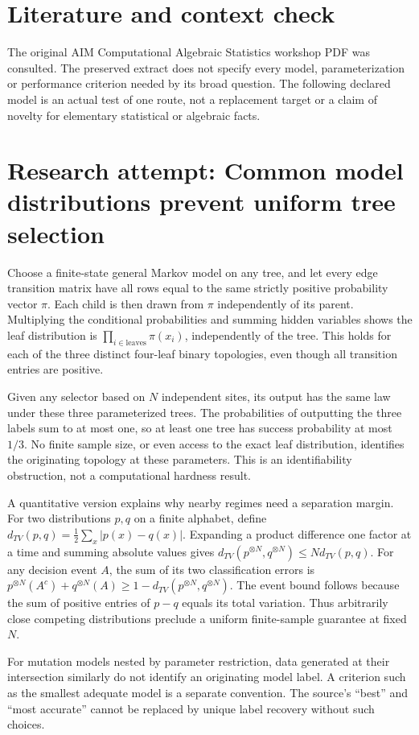\documentclass[11pt]{article}
\begin{document}
\section{Literature and context check}
The original AIM Computational Algebraic Statistics
 workshop PDF was consulted. The preserved extract does not specify every model,
 parameterization or performance criterion needed by its broad question. The
 following declared model is an actual test of one route, not a replacement
 target or a claim of novelty for elementary statistical or algebraic facts.
\section{Research attempt: Common model distributions prevent uniform tree selection}
Choose a finite-state general Markov model on any tree, and let every edge
transition matrix have all rows equal to the same strictly positive probability
vector $\pi$. Each child is then drawn from $\pi$ independently of its parent.
Multiplying the conditional probabilities and summing hidden variables shows
the leaf distribution is $\prod_{i\in\text{leaves}}\pi(x_i)$, independently
of the tree. This holds for each of the three distinct four-leaf binary
topologies, even though all transition entries are positive.

Given any selector based on $N$ independent sites, its output has the same law
under these three parameterized trees. The probabilities of outputting the
three labels sum to at most one, so at least one tree has success probability
at most $1/3$. No finite sample size, or even access to the exact leaf
distribution, identifies the originating topology at these parameters.
This is an identifiability obstruction, not a computational hardness result.

A quantitative version explains why nearby regimes need a separation margin.
For two distributions $p,q$ on a finite alphabet, define
$d_{TV}(p,q)=\frac12\sum_x|p(x)-q(x)|$. Expanding a product difference one
factor at a time and summing absolute values gives
$d_{TV}(p^{\otimes N},q^{\otimes N})\le N d_{TV}(p,q)$.
For any decision event $A$, the sum of its two classification errors is
$p^{\otimes N}(A^c)+q^{\otimes N}(A)
\ge1-d_{TV}(p^{\otimes N},q^{\otimes N})$.
The event bound follows because the sum of positive entries of $p-q$ equals
its total variation. Thus arbitrarily close competing distributions preclude
a uniform finite-sample guarantee at fixed $N$.

For mutation models nested by parameter restriction, data generated at their
intersection similarly do not identify an originating model label. A criterion
such as the smallest adequate model is a separate convention. The source's
``best'' and ``most accurate'' cannot be replaced by unique label recovery
without such choices.
\end{document}
